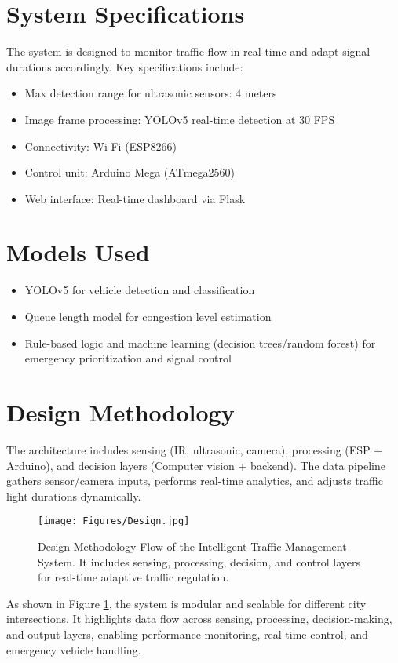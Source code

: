 \section{System Specifications}
The system is designed to monitor traffic flow in real-time and adapt signal durations accordingly. Key specifications include:
\begin{itemize}
\item Max detection range for ultrasonic sensors: 4 meters
\item Image frame processing: YOLOv5 real-time detection at 30 FPS
\item Connectivity: Wi-Fi (ESP8266)
\item Control unit: Arduino Mega (ATmega2560)
\item Web interface: Real-time dashboard via Flask
\end{itemize}

\section{Models Used}
\begin{itemize}
\item YOLOv5 for vehicle detection and classification
\item Queue length model for congestion level estimation
\item Rule-based logic and machine learning (decision trees/random forest) for emergency prioritization and signal control
\end{itemize}

\section{Design Methodology}
The architecture includes sensing (IR, ultrasonic, camera), processing (ESP + Arduino), and decision layers (Computer vision + backend). The data pipeline gathers sensor/camera inputs, performs real-time analytics, and adjusts traffic light durations dynamically.

\begin{figure}[H]
\centering
\texttt{[image: Figures/Design.jpg]}
\caption{Design Methodology Flow of the Intelligent Traffic Management System. It includes sensing, processing, decision, and control layers for real-time adaptive traffic regulation.}
\label{fig:design_flow}
\end{figure}

As shown in Figure \ref{fig:design_flow}, the system is modular and scalable for different city intersections. It highlights data flow across sensing, processing, decision-making, and output layers, enabling performance monitoring, real-time control, and emergency vehicle handling.



